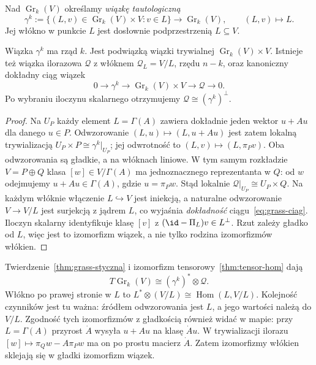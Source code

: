 \begin{definicja}
\label{def:grass-taut}
Nad $\operatorname{Gr}_k(V)$ określamy
\emph{wiązkę tautologiczną}
\[
 \gamma^k
 :=\{(L,v)\in\operatorname{Gr}_k(V)\times V:v\in L\}
 \longrightarrow\operatorname{Gr}_k(V),\qquad (L,v)\mapsto L.
\]
Jej włókno w punkcie $L$ jest dosłownie podprzestrzenią
$L\subseteq V$.
\end{definicja}

\begin{stwierdzenie}
\label{prop:grass-wiazki}
Wiązka $\gamma^k$ ma rząd $k$. Jest podwiązką
wiązki trywialnej $\operatorname{Gr}_k(V)\times V$.
Istnieje też wiązka ilorazowa $\mathcal Q$ z
włóknem $\mathcal Q_L=V/L$, rzędu $n-k$,
oraz kanoniczny dokładny ciąg wiązek
\begin{equation}\label{eq:grass-ciag}
 0\longrightarrow\gamma^k
 \longrightarrow\operatorname{Gr}_k(V)\times V
 \longrightarrow\mathcal Q\longrightarrow0.
\end{equation}
Po wybraniu iloczynu skalarnego otrzymujemy
$\mathcal Q\cong(\gamma^k)^\perp$.
\end{stwierdzenie}
\begin{proof}
Na $U_P$ każdy element $L=\Gamma(A)$ zawiera
dokładnie jeden wektor $u+Au$ dla danego $u\in P$.
Odwzorowanie $(L,u)\mapsto(L,u+Au)$ jest zatem lokalną
trywializacją $U_P\times P\cong\gamma^k|_{U_P}$;
jej odwrotność to $(L,v)\mapsto(L,\pi_Pv)$.
Oba odwzorowania są gładkie, a na włóknach liniowe.
W tym samym rozkładzie $V=P\oplus Q$ klasa
$[w]\in V/\Gamma(A)$ ma jednoznacznego
reprezentanta w $Q$: od $w$ odejmujemy
$u+Au\in\Gamma(A)$, gdzie $u=\pi_Pw$.
Stąd lokalnie $\mathcal Q|_{U_P}\cong U_P\times Q$.
Na każdym włóknie włączenie $L\hookrightarrow V$
jest iniekcją, a naturalne odwzorowanie $V\to V/L$ jest
surjekcją z jądrem $L$, co wyjaśnia \emph{dokładność}
ciągu~\eqref{eq:grass-ciag}. Iloczyn skalarny
identyfikuje klasę $[v]$ z $(\id-\Pi_L)v\in L^\perp$.
Rzut zależy gładko od $L$, więc jest to izomorfizm wiązek,
a nie tylko rodzina izomorfizmów włókien.
\end{proof}

\begin{uwaga}
Twierdzenie~\ref{thm:grass-styczna} i
izomorfizm tensorowy~\ref{thm:tensor-hom} dają
\[
 T\operatorname{Gr}_k(V)\cong
       (\gamma^k)^*\otimes\mathcal Q.
\]
Włókno po prawej stronie w $L$ to
$L^*\otimes(V/L)\cong\operatorname{Hom}(L,V/L)$.
Kolejność czynników jest tu ważna: źródłem odwzorowania
jest $L$, a jego wartości należą do $V/L$.
Zgodność tych izomorfizmów z gładkością również widać w mapie:
przy $L=\Gamma(A)$ przyrost $\dot A$ wysyła $u+Au$ na
klasę $\dot A u$. W trywializacji ilorazu
$[w]\mapsto\pi_Qw-A\pi_Pw$ ma on po prostu macierz $\dot A$.
Zatem izomorfizmy włókien sklejają się w gładki izomorfizm wiązek.
\end{uwaga}

